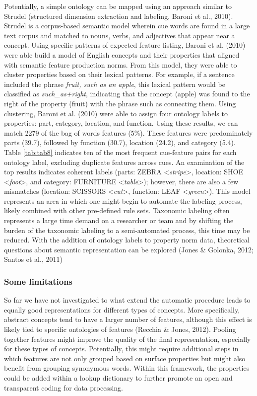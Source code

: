 \documentclass[man]{apa6}
\begin{document}
Potentially, a simple ontology can be mapped using an approach similar to Strudel (structured dimension extraction and labeling, Baroni et al., 2010). Strudel is a corpus-based semantic model wherein cue words are found in a large text corpus and matched to nouns, verbs, and adjectives that appear near a concept. Using specific patterns of expected feature listing, Baroni et al. (2010) were able build a model of English concepts and their properties that aligned with semantic feature production norms. From this model, they were able to cluster properties based on their lexical patterns. For example, if a sentence included the phrase \emph{fruit, such as an apple}, this lexical pattern would be classified as \emph{such\_as+right}, indicating that the concept (apple) was found to the right of the property (fruit) with the phrase such as connecting them. Using clustering, Baroni et al. (2010) were able to assign four ontology labels to properties: part, category, location, and function. Using these results, we can match 2279 of the bag of words features (5\%). These features were predominately parts (39.7), followed by function (30.7), location (24.2), and category (5.4). Table \ref{tab:tab8} indicates ten of the most frequent cue-feature pairs for each ontology label, excluding duplicate features across cues. An examination of the top results indicates coherent labels (parts: ZEBRA \textless{}\emph{stripe}\textgreater{}, location: SHOE \textless{}\emph{foot}\textgreater{}, and category: FURNITURE \textless{}\emph{table}\textgreater{}); however, there are also a few mismatches (location: SCISSORS \textless{}\emph{cut}\textgreater{}, function: LEAF \textless{}\emph{green}\textgreater{}). This model represents an area in which one might begin to automate the labeling process, likely combined with other pre-defined rule sets. Taxonomic labeling often represents a large time demand on a researcher or team and by shifting the burden of the taxonomic labeling to a semi-automated process, this time may be reduced. With the addition of ontology labels to property norm data, theoretical questions about semantic representation can be explored (Jones \& Golonka, 2012; Santos et al., 2011)

\hypertarget{some-limitations}{%
\subsubsection{Some limitations}\label{some-limitations}}

So far we have not investigated to what extend the automatic procedure leads to equally good representations for different types of concepts. More specifically, abstract concepts tend to have a larger number of features, although this effect is likely tied to specific ontologies of features (Recchia \& Jones, 2012). Pooling together features might improve the quality of the final representation, especially for these types of concepts. Potentially, this might require additional steps in which features are not only grouped based on surface properties but might also benefit from grouping synonymous words. Within this framework, the properties could be added within a lookup dictionary to further promote an open and transparent coding for data processing.
\end{document}
